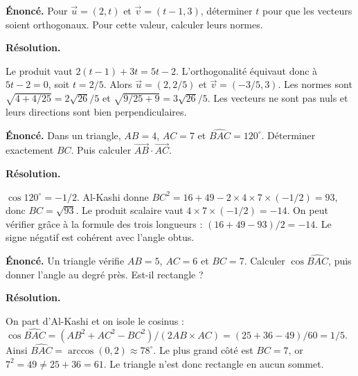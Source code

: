 \documentclass[11pt,a4paper]{article}
\begin{document}
\par\noindent\begin{minipage}{\linewidth}
{\small\color{Muted}\textbf{Énoncé.} Pour $\vec u=(2,t)$ et $\vec v=(t-1,3)$, déterminer $t$ pour que les vecteurs soient orthogonaux. Pour cette valeur, calculer leurs normes.}
\par\medskip
\textbf{Résolution.}\par
Le produit vaut $2(t-1)+3t=5t-2$. L’orthogonalité équivaut donc à $5t-2=0$, soit $t=2/5$. Alors $\vec u=(2,2/5)$ et $\vec v=(-3/5,3)$. Les normes sont $\sqrt{4+4/25}=2\sqrt{26}/5$ et $\sqrt{9/25+9}=3\sqrt{26}/5$. Les vecteurs ne sont pas nuls et leurs directions sont bien perpendiculaires.
\end{minipage}\par
\par\noindent\begin{minipage}{\linewidth}
{\small\color{Muted}\textbf{Énoncé.} Dans un triangle, $AB=4$, $AC=7$ et $\widehat{BAC}=120^\circ$. Déterminer exactement $BC$. Puis calculer $\overrightarrow{AB}\cdot\overrightarrow{AC}$.}
\par\medskip
\textbf{Résolution.}\par
$\cos120^\circ=-1/2$. Al-Kashi donne $BC^2=16+49-2\times4\times7\times(-1/2)=93$, donc $BC=\sqrt{93}$. Le produit scalaire vaut $4\times7\times(-1/2)=-14$. On peut vérifier grâce à la formule des trois longueurs : $(16+49-93)/2=-14$. Le signe négatif est cohérent avec l’angle obtus.
\end{minipage}\par
\par\noindent\begin{minipage}{\linewidth}
{\small\color{Muted}\textbf{Énoncé.} Un triangle vérifie $AB=5$, $AC=6$ et $BC=7$. Calculer $\cos\widehat{BAC}$, puis donner l’angle au degré près. Est-il rectangle ?}
\par\medskip
\textbf{Résolution.}\par
On part d’Al-Kashi et on isole le cosinus : $\cos\widehat{BAC}=(AB^2+AC^2-BC^2)/(2AB\times AC)=(25+36-49)/60=1/5$. Ainsi $\widehat{BAC}=\arccos(0,2)\approx78^\circ$. Le plus grand côté est $BC=7$, or $7^2=49\ne25+36=61$. Le triangle n’est donc rectangle en aucun sommet.
\end{minipage}\par
\end{document}
